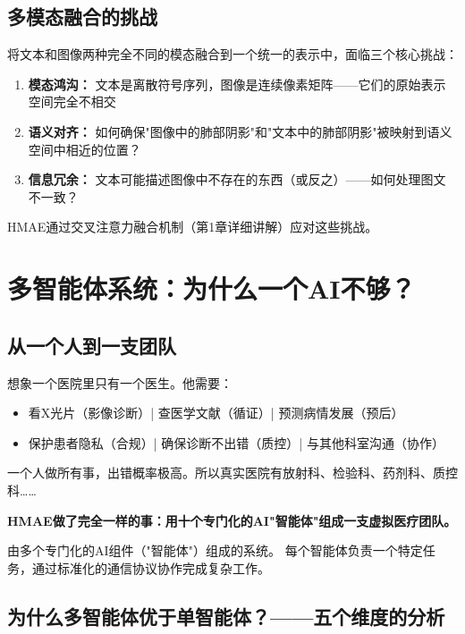 \documentclass[11pt,a4paper]{ctexart}
\begin{document}
\subsection{多模态融合的挑战}

将文本和图像两种完全不同的模态融合到一个统一的表示中，面临三个核心挑战：

\begin{enumerate}[nosep]
\item \textbf{模态鸿沟：} 文本是离散符号序列，图像是连续像素矩阵——它们的原始表示空间完全不相交
\item \textbf{语义对齐：} 如何确保"图像中的肺部阴影"和"文本中的肺部阴影"被映射到语义空间中相近的位置？
\item \textbf{信息冗余：} 文本可能描述图像中不存在的东西（或反之）——如何处理图文不一致？
\end{enumerate}

HMAE通过交叉注意力融合机制（第1章详细讲解）应对这些挑战。

\newpage

\section{多智能体系统：为什么一个AI不够？}

\subsection{从一个人到一支团队}

想象一个医院里只有一个医生。他需要：
\begin{itemize}[nosep]
\item 看X光片（影像诊断）| 查医学文献（循证）| 预测病情发展（预后）
\item 保护患者隐私（合规）| 确保诊断不出错（质控）| 与其他科室沟通（协作）
\end{itemize}

一个人做所有事，出错概率极高。所以真实医院有放射科、检验科、药剂科、质控科……

\textbf{HMAE做了完全一样的事：用十个专门化的AI"智能体"组成一支虚拟医疗团队。}

\begin{defbox}
由多个专门化的AI组件（"智能体"）组成的系统。
每个智能体负责一个特定任务，通过标准化的通信协议协作完成复杂工作。
\end{defbox}

\subsection{为什么多智能体优于单智能体？——五个维度的分析}
\end{document}
